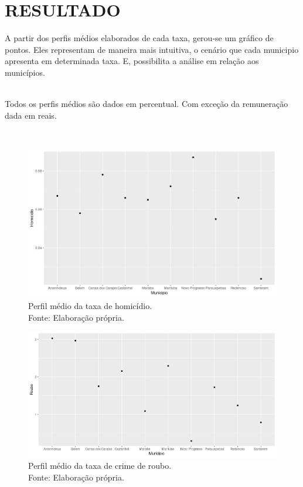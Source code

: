 \documentclass[a4paper, 10pt]{article}
\begin{document}
 \large
 \section{RESULTADO}
 
A partir dos perfis médios elaborados de cada taxa, gerou-se um gráfico de pontos. Eles representam de maneira mais intuitiva, o cenário que cada municipio apresenta em determinada taxa. E, possibilita a análise em relação aos municípios.

\\
Todos os perfis médios são dados em percentual. Com exceção da remuneração dada em reais.

\\

 \begin{figure}[H]
	\centering 
	\includegraphics[scale=0.5]{HOMICIDIO.png}
	\caption{\centering Perfil médio da taxa de homicídio. \\ Fonte: Elaboração própria.}
	\label{}
	\end{figure}


    \begin{figure}[H]
	\centering 
	\includegraphics[scale=0.45]{ROUBO (1).png}
	\caption{\centering Perfil médio da taxa de crime de roubo. \\ Fonte: Elaboração própria.}
	\label{}
	\end{figure}
	
\end{document}
